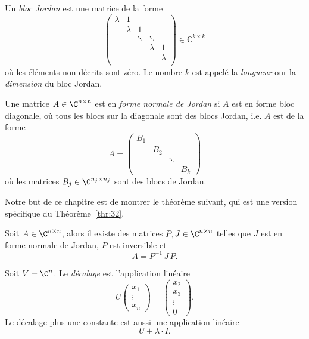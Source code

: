 \begin{definition}
  Un \emph{bloc Jordan} est une matrice de la forme 
  \begin{displaymath}
    \begin{pmatrix}
      λ & 1 \\
        & λ & 1 \\
        &   & \ddots & \ddots \\ 
        &   &             & λ & 1 \\
        &   &         &  & λ  \\
    \end{pmatrix} ∈ ℂ^{k ×k} 
  \end{displaymath}
où les éléments non décrits sont zéro. Le nombre $k$ est appelé la \emph{longueur} our la \emph{dimension} du bloc Jordan. 

Une matrice $A \in \C^{n \times n}$ est en \emph{forme normale de Jordan} si $A$ est en forme bloc diagonale, où tous les blocs sur la diagonale sont des blocs Jordan, i.e. $A$ est de la forme
\begin{displaymath}
  A =
  \begin{pmatrix}
    B_1 \\
        & B_2 \\
        &    & \ddots \\
        &    &       & B_k
  \end{pmatrix}
\end{displaymath}
où les matrices $B_j \in \C^{n_j\times n_j}$ sont des blocs de Jordan. 
\end{definition}


Notre but de ce chapitre  est de montrer le théorème suivant, qui est une version spécifique du  Théorème~\ref{thr:32}.

\begin{theorem}
  \label{thr:41}
  Soit $A \in \C^{n \times n}$, alors il existe des matrices $P,J \in \C^{n \times n}$ telles que $J$ est en forme normale de Jordan, $P$ est inversible et 
  \begin{displaymath}
    A = P^{-1} \,J \,P. 
  \end{displaymath}
\end{theorem}

\begin{definition}
  \label{def:36}
  Soit $V  = \C^n$. Le \emph{décalage}  est l'application linéaire 
  \begin{displaymath}
    U
    \begin{pmatrix}
      x_1 \\ \vdots \\ x_n
    \end{pmatrix}
     = 
     \begin{pmatrix}
       x_2 \\ x_3 \\ \vdots \\ 0
     \end{pmatrix}. 
  \end{displaymath}
  Le décalage plus une constante est aussi une application linéaire 
  \begin{displaymath}
    U + \lambda \cdot I. 
  \end{displaymath}
\end{definition}

